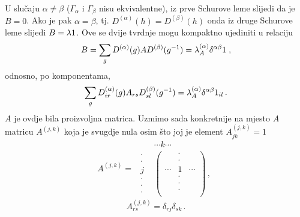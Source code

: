 U slučaju $\alpha\neq\beta$ ($\Gamma_\alpha$ i $\Gamma_\beta$ nisu 
ekvivalentne),
iz prve Schurove leme slijedi da je $B=0$. Ako je pak $\alpha=\beta$, tj.
$D^{(\alpha)}(h)=D^{(\beta)}(h)$ onda iz druge Schurove leme
slijedi $B=\lambda 1$.
Ove se dvije tvrdnje mogu kompaktno ujediniti u relaciju
\begin{equation}
  B = \sum_g D^{(\alpha)}(g) A D^{(\beta)}(g^{-1}) =
 \lambda^{(\alpha)}_A \delta^{\alpha\beta} 1 \;,
\end{equation}
odnosno, po komponentama,
\begin{equation}
\sum_g D^{(\alpha)}_{ir}(g) A_{rs} D^{(\beta)}_{sl}(g^{-1})
 = \lambda_{A}^{(\alpha)} \delta^{\alpha\beta} 1_{il} \,.
 \label{eq:ortpokomp}
\end{equation}
$A$ je ovdje bila proizvoljna matrica. Uzmimo sada konkretnije na mjesto $A$
matricu $A^{(j,k)}$ koja je svugdje nula osim što joj je
element $A^{(j,k)}_{jk}=1$
\begin{displaymath}
 A^{(j,k)}=
\begin{array}{cc}
 & \cdots k \cdots \\
        \begin{array}{c}
         \cdot \\ \cdot \\ j \\ \cdot \\ \cdot \\ \cdot 
        \end{array}
 & 
\begin{pmatrix}
  & \cdot & \\
  & \cdot & \\
 \cdots & 1  & \cdots \\
  & \cdot & \\
  & \cdot & \\
  & \cdot & \\
\end{pmatrix} \,,
\end{array}
\end{displaymath}
\begin{displaymath}
A^{(j,k)}_{rs}=\delta_{rj}\delta_{sk} \,.
\end{displaymath}

